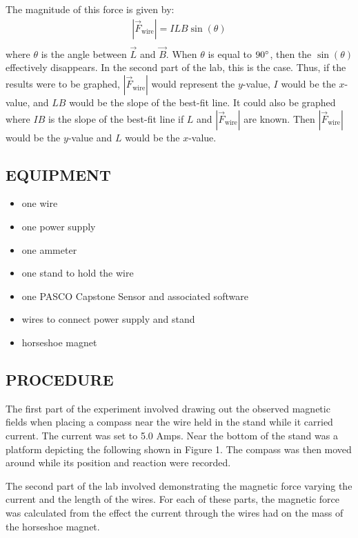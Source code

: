 \documentclass [12pt, letterpaper, twoside]{article}
\begin{document}
\noindent
The magnitude of this force is given by:
\begin{equation*}
  \begin{split}
    |\vec{F}_{\text{wire}}| = ILB\sin(\theta) \\
  \end{split}
\end{equation*}
where \(\theta\) is the angle between \(\vec{L}\) and \(\vec{B}\). When \(\theta\) is equal to \(90\degree\), then the \(\sin(\theta)\) effectively disappears. In the second part of the lab, this is the case. Thus, if the results were to be graphed, \(|\vec{F}_{\text{wire}}|\) would represent the \(y\)-value, \(I\) would be the \(x\)-value, and \(LB\) would be the slope of the best-fit line. It could also be graphed where \(IB\) is the slope of the best-fit line if \(L\) and \(|\vec{F}_{\text{wire}}|\) are known. Then \(|\vec{F}_{\text{wire}}|\) would be the \(y\)-value and \(L\) would be the \(x\)-value.

\subsection*{EQUIPMENT}
  \noindent
  \begin{itemize}
    \itemsep0em
    \item{one wire}
    \item{one power supply}
    \item{one ammeter}
    \item{one stand to hold the wire}
    \item{one PASCO Capstone Sensor and associated software}
    \item{wires to connect power supply and stand}
    \item{horseshoe magnet}
  \end{itemize}

\subsection*{PROCEDURE}
The first part of the experiment involved drawing out the observed magnetic fields when placing a compass near the wire held in the stand while it carried current. The current was set to 5.0 Amps. Near the bottom of the stand was a platform depicting the following shown in Figure 1. The compass was then moved around while its position and reaction were recorded.

\noindent
The second part of the lab involved demonstrating the magnetic force varying the current and the length of the wires. For each of these parts, the magnetic force was calculated from the effect the current through the wires had on the mass of the horseshoe magnet.
\end{document}
